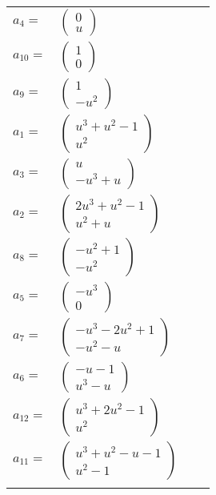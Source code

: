 \documentclass[1p]{elsarticle_modified}
\theoremstyle{definition}
\begin{document}
\begin{tabular}{m{7pt} m{180pt} m{7pt} m{180pt} }
\flushright $a_{4}=$&$\begin{pmatrix}0\\u\end{pmatrix}$ \\
\flushright $a_{10}=$&$\begin{pmatrix}1\\0\end{pmatrix}$ \\
\flushright $a_{9}=$&$\begin{pmatrix}1\\- u^2\end{pmatrix}$ \\
\flushright $a_{1}=$&$\begin{pmatrix}u^3+u^2-1\\u^2\end{pmatrix}$ \\
\flushright $a_{3}=$&$\begin{pmatrix}u\\- u^3+u\end{pmatrix}$ \\
\flushright $a_{2}=$&$\begin{pmatrix}2 u^3+u^2-1\\u^2+u\end{pmatrix}$ \\
\flushright $a_{8}=$&$\begin{pmatrix}- u^2+1\\- u^2\end{pmatrix}$ \\
\flushright $a_{5}=$&$\begin{pmatrix}- u^3\\0\end{pmatrix}$ \\
\flushright $a_{7}=$&$\begin{pmatrix}- u^3-2 u^2+1\\- u^2- u\end{pmatrix}$ \\
\flushright $a_{6}=$&$\begin{pmatrix}- u-1\\u^3- u\end{pmatrix}$ \\
\flushright $a_{12}=$&$\begin{pmatrix}u^3+2 u^2-1\\u^2\end{pmatrix}$ \\
\flushright $a_{11}=$&$\begin{pmatrix}u^3+u^2- u-1\\u^2-1\end{pmatrix}$\\&\end{tabular}
\end{document}
